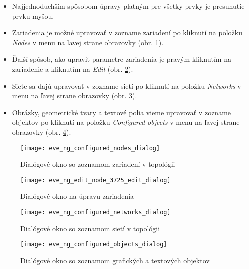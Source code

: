 \begin{enumerate}[noitemsep]
    \begin{itemize}[noitemsep]
        \item Najjednoduchším spôsobom úpravy platným pre všetky prvky je presunutie prvku myšou.
        \item Zariadenia je možné upravovať v zozname zariadení po kliknutí na položku \emph{Nodes} v menu na ľavej strane obrazovky (obr. \ref{obr:eve_ng_configured_nodes_dialog}).
        \item Ďalší spôsob, ako upraviť parametre zariadenia je pravým kliknutím na zariadenie a kliknutím na \emph{Edit} (obr. \ref{obr:eve_ng_edit_node_dialog}).
        \item Siete sa dajú upravovať v zozname sietí po kliknutí na položku \emph{Networks} v menu na ľavej strane obrazovky (obr. \ref{obr:eve_ng_configured_networks_dialog}).
        \item Obrázky, geometrické tvary a textové polia vieme upravovať v zozname objektov po kliknutí na položku \emph{Configured objects} v menu na ľavej strane obrazovky (obr. \ref{obr:eve_ng_configured_objects_dialog}).
    \end{itemize}

\begin{figure}
    \centering
    \texttt{[image: eve\_ng\_configured\_nodes\_dialog]}
    \caption{Dialógové okno so zoznamom zariadení v topológii}
    \label{obr:eve_ng_configured_nodes_dialog}
\end{figure}

\begin{figure}
    \centering
    \texttt{[image: eve\_ng\_edit\_node\_3725\_edit\_dialog]}
    \caption{Dialógové okno na úpravu zariadenia}
    \label{obr:eve_ng_edit_node_dialog}
\end{figure}

\begin{figure}
    \centering
    \texttt{[image: eve\_ng\_configured\_networks\_dialog]}
    \caption{Dialógové okno so zoznamom sietí v topológii}
    \label{obr:eve_ng_configured_networks_dialog}
\end{figure}

\begin{figure}
    \centering
    \texttt{[image: eve\_ng\_configured\_objects\_dialog]}
    \caption{Dialógové okno so zoznamom grafických a textových objektov}
    \label{obr:eve_ng_configured_objects_dialog}
\end{figure}




\end{enumerate}
